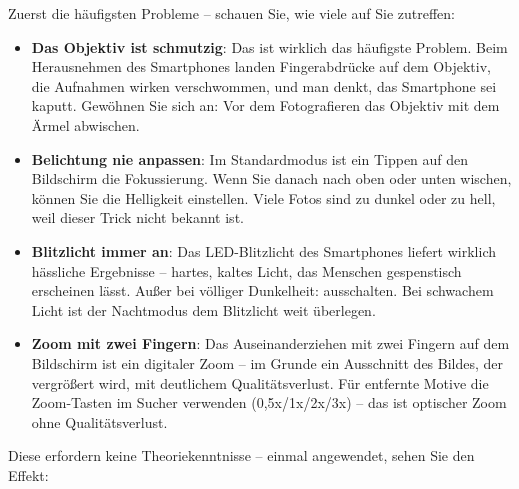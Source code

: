 


Zuerst die häufigsten Probleme – schauen Sie, wie viele auf Sie zutreffen:

\begin{itemize}
  \item \textbf{Das Objektiv ist schmutzig}: Das ist wirklich das häufigste Problem. Beim Herausnehmen des Smartphones landen Fingerabdrücke auf dem Objektiv, die Aufnahmen wirken verschwommen, und man denkt, das Smartphone sei kaputt. Gewöhnen Sie sich an: Vor dem Fotografieren das Objektiv mit dem Ärmel abwischen.
  \item \textbf{Belichtung nie anpassen}: Im Standardmodus ist ein Tippen auf den Bildschirm die Fokussierung. Wenn Sie danach nach oben oder unten wischen, können Sie die Helligkeit einstellen. Viele Fotos sind zu dunkel oder zu hell, weil dieser Trick nicht bekannt ist.
  \item \textbf{Blitzlicht immer an}: Das LED-Blitzlicht des Smartphones liefert wirklich hässliche Ergebnisse – hartes, kaltes Licht, das Menschen gespenstisch erscheinen lässt. Außer bei völliger Dunkelheit: ausschalten. Bei schwachem Licht ist der Nachtmodus dem Blitzlicht weit überlegen.
  \item \textbf{Zoom mit zwei Fingern}: Das Auseinanderziehen mit zwei Fingern auf dem Bildschirm ist ein digitaler Zoom – im Grunde ein Ausschnitt des Bildes, der vergrößert wird, mit deutlichem Qualitätsverlust. Für entfernte Motive die Zoom-Tasten im Sucher verwenden (0,5x/1x/2x/3x) – das ist optischer Zoom ohne Qualitätsverlust.
\end{itemize}


Diese erfordern keine Theoriekenntnisse – einmal angewendet, sehen Sie den Effekt:


